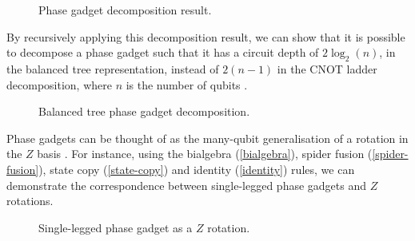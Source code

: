 \begin{figure}[H]
    \centering
    \caption{Phase gadget decomposition result.}
    \label{phase-gadget-decomposition}
\end{figure}

By recursively applying this decomposition result, we can show that it is possible to decompose a phase gadget such that it has a circuit depth of $2\log_2(n)$, in the balanced tree representation, instead of $2(n-1)$ in the CNOT ladder decomposition, where $n$ is the number of qubits \cite{Cowtan2019}.

\begin{figure}[H]
    \centering
    \caption{Balanced tree phase gadget decomposition.}
    \label{balanced-tree}
\end{figure}


Phase gadgets can be thought of as the many-qubit generalisation of a rotation in the $Z$ basis \cite{Yeung2020}. For instance, using the bialgebra (\ref{bialgebra}), spider fusion (\ref{spider-fusion}), state copy (\ref{state-copy}) and identity (\ref{identity}) rules, we can demonstrate the correspondence between single-legged phase gadgets and $Z$ rotations.

\begin{figure}[H]
    \centering
    \caption{Single-legged phase gadget as a $Z$ rotation.}
    \label{phase-gadget-single-leg}
\end{figure}

